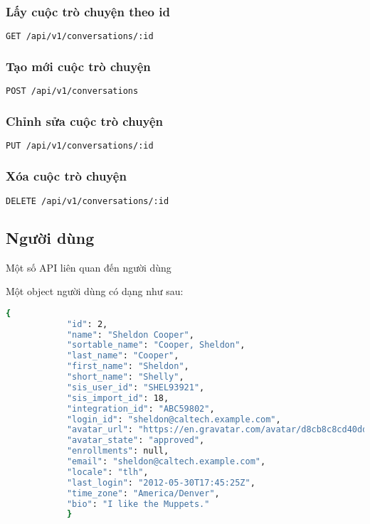 \documentclass[../Thesis.tex]{subfiles}
\begin{document}
        \subsubsection{Lấy cuộc trò chuyện theo id}
        \begin{lstlisting}[language=bash]
            GET /api/v1/conversations/:id
        \end{lstlisting}

        \subsubsection{Tạo mới cuộc trò chuyện}
        \begin{lstlisting}[language=bash]
            POST /api/v1/conversations
        \end{lstlisting}

        \subsubsection{Chỉnh sửa cuộc trò chuyện}
        \begin{lstlisting}[language=bash]
            PUT /api/v1/conversations/:id
        \end{lstlisting}

        \subsubsection{Xóa cuộc trò chuyện}
        \begin{lstlisting}[language=bash]
            DELETE /api/v1/conversations/:id
        \end{lstlisting}

    \subsection{Người dùng}

        Một số API liên quan đến người dùng

        Một object người dùng có dạng như sau:

        \begin{lstlisting}[language=bash]
            {
            "id": 2,
            "name": "Sheldon Cooper",
            "sortable_name": "Cooper, Sheldon",
            "last_name": "Cooper",
            "first_name": "Sheldon",
            "short_name": "Shelly",
            "sis_user_id": "SHEL93921",
            "sis_import_id": 18,
            "integration_id": "ABC59802",
            "login_id": "sheldon@caltech.example.com",
            "avatar_url": "https://en.gravatar.com/avatar/d8cb8c8cd40ddf0cd05241443a591868?s=80&r=g",
            "avatar_state": "approved",
            "enrollments": null,
            "email": "sheldon@caltech.example.com",
            "locale": "tlh",
            "last_login": "2012-05-30T17:45:25Z",
            "time_zone": "America/Denver",
            "bio": "I like the Muppets."
            }
        \end{lstlisting}
\end{document}
